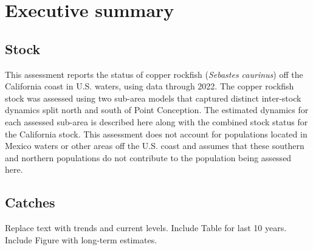 \documentclass[11pt,
  english,
  letterpaper,
]{article}
\begin{document}
\pagestyle{plain}  %
\renewcommand*{\thefootnote}{\arabic{footnote}}  %
\setcounter{footnote}{0}  %
\renewcommand{\headrulewidth}{0.5pt}
\renewcommand{\footrulewidth}{0.5pt}

\newcommand{\lt}{\ensuremath <}
\newcommand{\gt}{\ensuremath >}

\pagebreak
{}
\setcounter{page}{1}

\renewcommand{\thetable}{\roman{table}}
\renewcommand{\thefigure}{\roman{figure}}

\setlength\parskip{0.5em plus 0.1em minus 0.2em}

\hypertarget{executive-summary}{%
\section*{Executive summary}\label{executive-summary}}

\hypertarget{stock}{%
\subsection*{Stock}\label{stock}}

This assessment reports the status of copper rockfish (\emph{Sebastes caurinus}) off the California coast in U.S. waters, using data through 2022. The copper rockfish stock was assessed using two sub-area models that captured distinct inter-stock dynamics split north and south of Point Conception. The estimated dynamics for each assessed sub-area is described here along with the combined stock status for the California stock. This assessment does not account for populations located in Mexico waters or other areas off the U.S. coast and assumes that these southern and northern populations do not contribute to the population being assessed here.

\hypertarget{catches}{%
\subsection*{Catches}\label{catches}}

Replace text with trends and current levels. Include Table for last 10 years. Include Figure with long-term estimates.
\end{document}
